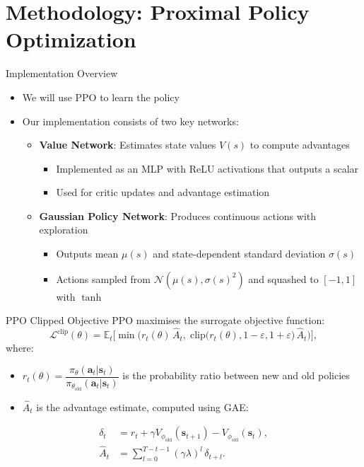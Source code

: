 \documentclass[10pt,aspectratio=169]{beamer}
\begin{document}
\section{Methodology: Proximal Policy Optimization}

\begin{frame}{Implementation Overview}
\begin{itemize}
  \item We will use PPO to learn the policy
  \item Our implementation consists of two key networks:
  \begin{itemize}
    \item \textbf{Value Network}: Estimates state values $V(s)$ to compute advantages
    \begin{itemize}
      \item Implemented as an MLP with ReLU activations that outputs a scalar
      \item Used for critic updates and advantage estimation
    \end{itemize}
    \item \textbf{Gaussian Policy Network}: Produces continuous actions with exploration
    \begin{itemize}
      \item Outputs mean $\mu(s)$ and state-dependent standard deviation $\sigma(s)$
      \item Actions sampled from $\mathcal{N}(\mu(s), \sigma(s)^2)$ and squashed to $[-1, 1]$ with $\tanh$
    \end{itemize}
  \end{itemize}
\end{itemize}
\end{frame}

\begin{frame}{PPO Clipped Objective}
\small
PPO maximises the surrogate objective function:
\begin{equation*}
\mathcal{L}^{\text{clip}}(\theta) = \mathbb{E}_t\Big[\min\big(r_t(\theta)\,\hat{A}_t,\;\text{clip}\big(r_t(\theta),1-\varepsilon,1+\varepsilon\big)\,\hat{A}_t\big)\Big],
\end{equation*}
where:
\begin{itemize}
  \item $r_t(\theta)=\dfrac{\pi_\theta(\bm{a}_t|\bm{s}_t)}{\pi_{\theta_{\text{old}}}(\bm{a}_t|\bm{s}_t)}$ is the probability ratio between new and old policies
  \item $\hat{A}_t$ is the advantage estimate, computed using GAE:
\end{itemize}
\begin{align*}
\delta_t &= r_t + \gamma V_{\phi_{\text{old}}}(\bm{s}_{t+1}) - V_{\phi_{\text{old}}}(\bm{s}_{t}),\\
\hat{A}_t &= \sum_{l=0}^{T-t-1} (\gamma\lambda)^l\,\delta_{t+l}.
\end{align*}
\end{frame}
\end{document}
